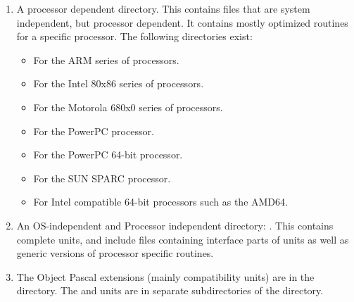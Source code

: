 \begin{enumerate}
\begin{itemize}
processors.
\item {} For the Novell netware platform.
\item {} For the Novell netware platform using the C library.
\item {} For the OpenBSD platform.
\item {} for \ostwo.
\item {} For the \palmos Dragonball processor based platform.
\item {} For posix interfaces (used for easier porting).
\item {} For the \solaris platform. It has one subdirectory for each of the supported
processors.
\item {} For the symbian mobile phone OS.
\item {} For the \qnx.
\item {} For unix common interfaces (used for easier porting).
\item {} For Windows 32-bit platforms.
\item {} For Windows 64-bit platforms.
\item {} For the Windows CE embedded platform (arm CPU).
\item {} For posix interfaces (used for easier porting).
\end{itemize}
\item A processor dependent directory. This contains files that are system
independent, but processor dependent. It contains mostly optimized routines
for a specific processor. The following directories exist:
\begin{itemize}
\item {} For the ARM series of processors.
\item {} For the Intel 80x86 series of processors.
\item {} For the Motorola 680x0 series of processors.
\item {} For the PowerPC processor.
\item {} For the PowerPC 64-bit processor.
\item {} For the SUN SPARC processor.
\item {} For Intel compatible 64-bit processors such as the AMD64.
\end{itemize}
\item An OS-independent and Processor independent directory: . This
contains complete units, and include files containing interface parts of
units as well as generic versions of processor specific routines.
\item The Object Pascal extensions (mainly \delphi compatibility units) are
in the  directory. The  and  units
are in separate subdirectories of the  directory.
\end{enumerate}


